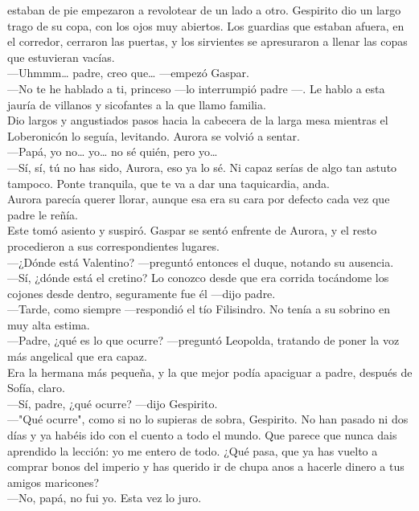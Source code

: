 \documentclass[
  letterpaper,
]{book}
\begin{document}
estaban de pie empezaron a revolotear de un lado a otro. Gespirito dio
un largo trago de su copa, con los ojos muy abiertos. Los guardias que
estaban afuera, en el corredor, cerraron las puertas, y los sirvientes
se apresuraron a llenar las copas que estuvieran vacías.\\
---Uhmmm\ldots{} padre, creo que\ldots{} ---empezó Gaspar.\\
---No te he hablado a ti, princeso ---lo interrumpió padre ---. Le hablo
a esta jauría de villanos y sicofantes a la que llamo familia.\\
Dio largos y angustiados pasos hacia la cabecera de la larga mesa
mientras el Loberonicón lo seguía, levitando. Aurora se volvió a
sentar.\\
---Papá, yo no\ldots{} yo\ldots{} no sé quién, pero yo\ldots{}\\
---Sí, sí, tú no has sido, Aurora, eso ya lo sé. Ni capaz serías de algo
tan astuto tampoco. Ponte tranquila, que te va a dar una taquicardia,
anda.\\
Aurora parecía querer llorar, aunque esa era su cara por defecto cada
vez que padre le reñía.\\
Este tomó asiento y suspiró. Gaspar se sentó enfrente de Aurora, y el
resto procedieron a sus correspondientes lugares.\\
---¿Dónde está Valentino? ---preguntó entonces el duque, notando su
ausencia.\\
---Sí, ¿dónde está el cretino? Lo conozco desde que era corrida
tocándome los cojones desde dentro, seguramente fue él ---dijo padre.\\
---Tarde, como siempre ---respondió el tío Filisindro. No tenía a su
sobrino en muy alta estima.\\
---Padre, ¿qué es lo que ocurre? ---preguntó Leopolda, tratando de poner
la voz más angelical que era capaz.\\
Era la hermana más pequeña, y la que mejor podía apaciguar a padre,
después de Sofía, claro.\\
---Sí, padre, ¿qué ocurre? ---dijo Gespirito.\\
---"Qué ocurre", como si no lo supieras de sobra, Gespirito. No han
pasado ni dos días y ya habéis ido con el cuento a todo el mundo. Que
parece que nunca dais aprendido la lección: yo me entero de todo. ¿Qué
pasa, que ya has vuelto a comprar bonos del imperio y has querido ir de
chupa anos a hacerle dinero a tus amigos maricones?\\
---No, papá, no fui yo. Esta vez lo juro.\\
\end{document}
